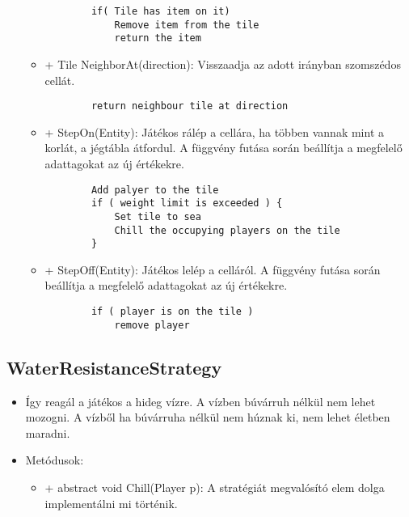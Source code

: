 \begin{itemize}
\begin{itemize}
		\begin{lstlisting}
		if( Tile has item on it)
			Remove item from the tile
			return the item
		\end{lstlisting}
		\item + Tile NeighborAt(direction): Visszaadja az adott irányban szomszédos cellát.
		\begin{lstlisting}
		return neighbour tile at direction
		\end{lstlisting}
		\item + StepOn(Entity): Játékos rálép a cellára, ha többen vannak mint a korlát, a jégtábla átfordul. A függvény futása során beállítja a megfelelő adattagokat az új értékekre.
		\begin{lstlisting}
		Add palyer to the tile
		if ( weight limit is exceeded ) {
			Set tile to sea
			Chill the occupying players on the tile
		}
		\end{lstlisting}
		\item + StepOff(Entity): Játékos lelép a celláról. A függvény futása során beállítja a megfelelő adattagokat az új értékekre.
		\begin{lstlisting}
		if ( player is on the tile )
			remove player
		\end{lstlisting}
	\end{itemize}
\end{itemize}

\subsection{WaterResistanceStrategy}
\begin{itemize}
	\item Így reagál a játékos a hideg vízre. A vízben búvárruh nélkül nem lehet mozogni. A vízből ha búvárruha nélkül nem húznak ki, nem lehet életben maradni.
	\item Metódusok:
	\begin{itemize}
		\item + abstract void Chill(Player p): A stratégiát megvalósító elem dolga implementálni mi történik.
	\end{itemize}
\end{itemize}

